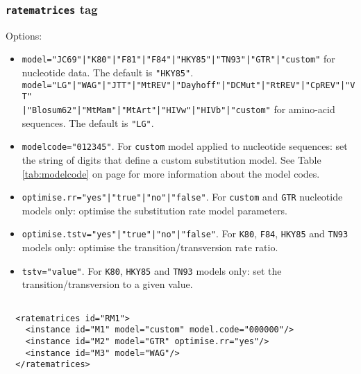 \documentclass[a4paper,12pt]{article}
\newcommand{\x}[1]{\texttt{#1}}
\begin{document}
\subsubsection{{\tt ratematrices} tag}\label{sec:xmlratematrices}
Options:
\begin{itemize}
\item \x{model="JC69"|"K80"|"F81"|"F84"|"HKY85"|"TN93"|"GTR"|"custom"} for nucleotide data. The default is \x{"HKY85"}.\\
\x{model="LG"|"WAG"|"JTT"|"MtREV"|"Dayhoff"|"DCMut"|"RtREV"|"CpREV"|"VT"}\\\x{|"Blosum62"|"MtMam"|"MtArt"|"HIVw"|"HIVb"|"custom"}
for amino-acid sequences. The default is \x{"LG"}.
\item \x{modelcode="012345"}. For \x{custom} model applied to nucleotide sequences: set the
  string of digits that define a custom substitution model. See Table \ref{tab:modelcode} on page
  \pageref{tab:modelcode} for more
  information about the model codes.
\item \x{optimise.rr="yes"|"true"|"no"|"false"}. For \x{custom} and \x{GTR} nucleotide models only:
  optimise the substitution rate model parameters. 
\item \x{optimise.tstv="yes"|"true"|"no"|"false"}. For \x{K80}, \x{F84}, \x{HKY85} and \x{TN93}
  models only: optimise the transition/transversion rate ratio. 
\item \x{tstv="value"}. For \x{K80}, \x{HKY85} and \x{TN93} models only: set the transition/transversion to a
  given value.  
\end{itemize}
\vspace{0.2cm}
\begin{Verbatim}[frame=single, label=Example of `ratematrices' tag, samepage=true, baselinestretch=0.5]

  <ratematrices id="RM1">
    <instance id="M1" model="custom" model.code="000000"/>
    <instance id="M2" model="GTR" optimise.rr="yes"/>
    <instance id="M3" model="WAG"/>
  </ratematrices>

\end{Verbatim}
\end{document}

